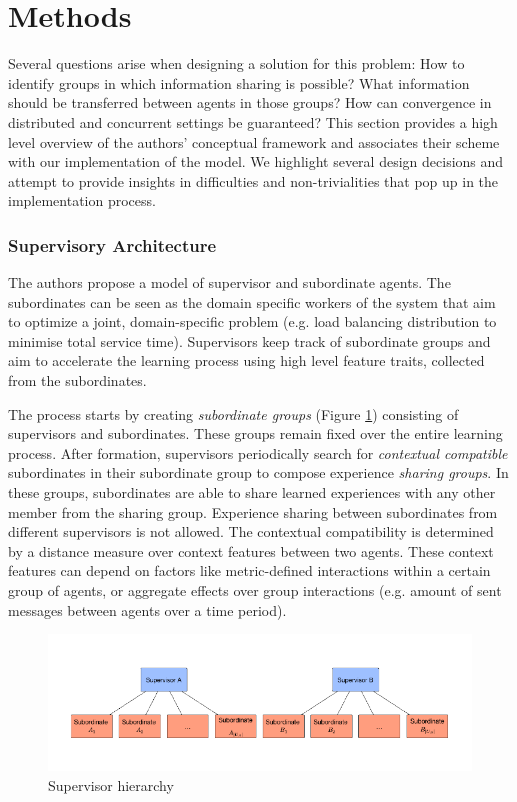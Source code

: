 \documentclass[letterpaper]{article}
\begin{document}
\section{Methods} \label{sec:methods}
Several questions arise when designing a solution for this problem: How to identify groups in which information sharing is possible? What information should be transferred between agents in those groups? How can convergence in distributed and concurrent settings be guaranteed? This section provides a high level overview of the authors' conceptual framework and associates their scheme with our implementation of the model.  We highlight several design decisions and attempt to provide insights in difficulties and non-trivialities that pop up in the implementation process.

\subsubsection{Supervisory Architecture}
The authors propose a model of supervisor and subordinate agents. The subordinates can be seen as the domain specific workers of the system that aim to optimize a joint, domain-specific problem (e.g. load balancing distribution to minimise total service time). Supervisors keep track of subordinate groups and aim to accelerate the learning process using high level feature traits, collected from the subordinates.

The process starts by creating \textit{subordinate groups} (Figure \ref{fig:subordinate}) consisting of supervisors and subordinates. These groups remain fixed over the entire learning process. After formation, supervisors periodically search for \textit{contextual compatible} subordinates in their subordinate group to compose experience \textit{sharing groups}. In these groups, subordinates are able to share learned experiences with any other member from the sharing group. Experience sharing between subordinates from different supervisors is not allowed. The contextual compatibility is determined by a distance measure over context features between two agents. These context features can depend on factors like metric-defined interactions within a certain group of agents, or aggregate effects over group interactions (e.g. amount of sent messages between agents over a time period).
\begin{figure}[H]
 \begin{center}
  \includegraphics[width=\linewidth]{figures/subordinates}
  \caption{Supervisor hierarchy \citep{garant2015accelerating}}
  \label{fig:subordinate}
 \end{center}
\end{figure}
\end{document}
